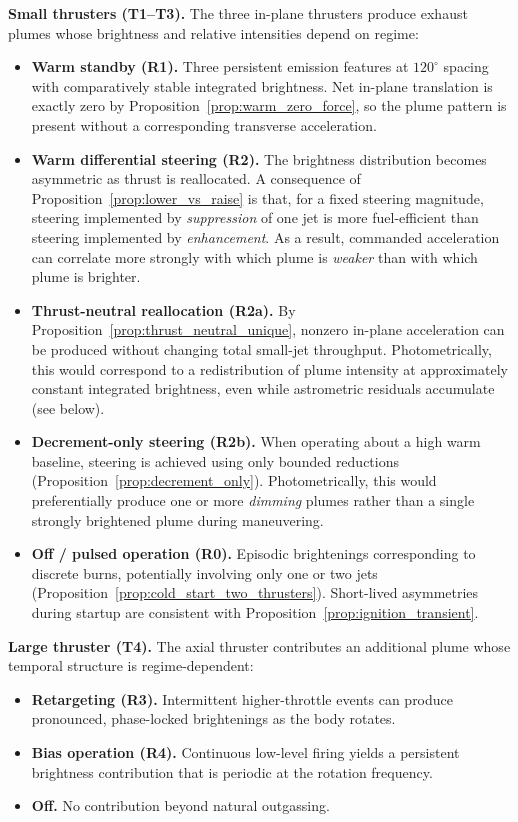 \documentclass{article}
\begin{document}
\textbf{Small thrusters (T1--T3).}
The three in-plane thrusters produce exhaust plumes whose brightness and relative intensities depend on regime:

\begin{itemize}
    \item \textbf{Warm standby (R1).} Three persistent emission features at $120^\circ$ spacing with comparatively stable integrated brightness. Net in-plane translation is exactly zero by Proposition~\ref{prop:warm_zero_force}, so the plume pattern is present without a corresponding transverse acceleration.

    \item \textbf{Warm differential steering (R2).} The brightness distribution becomes asymmetric as thrust is reallocated. A consequence of Proposition~\ref{prop:lower_vs_raise} is that, for a fixed steering magnitude, steering implemented by \emph{suppression} of one jet is more fuel-efficient than steering implemented by \emph{enhancement}. As a result, commanded acceleration can correlate more strongly with which plume is \emph{weaker} than with which plume is brighter.

    \item \textbf{Thrust-neutral reallocation (R2a).} By Proposition~\ref{prop:thrust_neutral_unique}, nonzero in-plane acceleration can be produced without changing total small-jet throughput. Photometrically, this would correspond to a redistribution of plume intensity at approximately constant integrated brightness, even while astrometric residuals accumulate (see below).

    \item \textbf{Decrement-only steering (R2b).} When operating about a high warm baseline, steering is achieved using only bounded reductions (Proposition~\ref{prop:decrement_only}). Photometrically, this would preferentially produce one or more \emph{dimming} plumes rather than a single strongly brightened plume during maneuvering.

    \item \textbf{Off / pulsed operation (R0).} Episodic brightenings corresponding to discrete burns, potentially involving only one or two jets (Proposition~\ref{prop:cold_start_two_thrusters}). Short-lived asymmetries during startup are consistent with Proposition~\ref{prop:ignition_transient}.
    
\end{itemize}

\textbf{Large thruster (T4).}
The axial thruster contributes an additional plume whose temporal structure is regime-dependent:
\begin{itemize}
    \item \textbf{Retargeting (R3).} Intermittent higher-throttle events can produce pronounced, phase-locked brightenings as the body rotates.
    \item \textbf{Bias operation (R4).} Continuous low-level firing yields a persistent brightness contribution that is periodic at the rotation frequency.
    \item \textbf{Off.} No contribution beyond natural outgassing.
\end{itemize}
\end{document}
